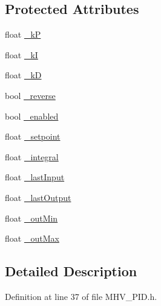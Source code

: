 \subsection*{Protected Attributes}
\begin{DoxyCompactItemize}
\item 
float \hyperlink{class_m_h_v___p_i_d_a2987b7582914a11ec39c38c2c2f8bb4f}{\-\_\-k\-P}
\item 
float \hyperlink{class_m_h_v___p_i_d_a47e47fe3d120325d9b12e205a274dcaa}{\-\_\-k\-I}
\item 
float \hyperlink{class_m_h_v___p_i_d_a64e69c4f8d1823d16314c88f98a4e18b}{\-\_\-k\-D}
\item 
bool \hyperlink{class_m_h_v___p_i_d_ae47baf90291256480ae57cbbc1ed917c}{\-\_\-reverse}
\item 
bool \hyperlink{class_m_h_v___p_i_d_a17e676a4ac1b18dcf30417b73265e87f}{\-\_\-enabled}
\item 
float \hyperlink{class_m_h_v___p_i_d_a46322bf586cac91fef5c2e38f269c718}{\-\_\-setpoint}
\item 
float \hyperlink{class_m_h_v___p_i_d_a26def3787ab18a8681c361720090b0df}{\-\_\-integral}
\item 
float \hyperlink{class_m_h_v___p_i_d_aa649c3528fb35b99ac6ce0dca338fcfb}{\-\_\-last\-Input}
\item 
float \hyperlink{class_m_h_v___p_i_d_a8464b83c97658e1f78a0c927476af6de}{\-\_\-last\-Output}
\item 
float \hyperlink{class_m_h_v___p_i_d_a1a7aba4cfb7c347428fade3e7a0f6e98}{\-\_\-out\-Min}
\item 
float \hyperlink{class_m_h_v___p_i_d_a0ef2b6cdafc241e3678a4c4f3efbdcec}{\-\_\-out\-Max}
\end{DoxyCompactItemize}


\subsection{Detailed Description}


Definition at line 37 of file M\-H\-V\-\_\-\-P\-I\-D.\-h.



